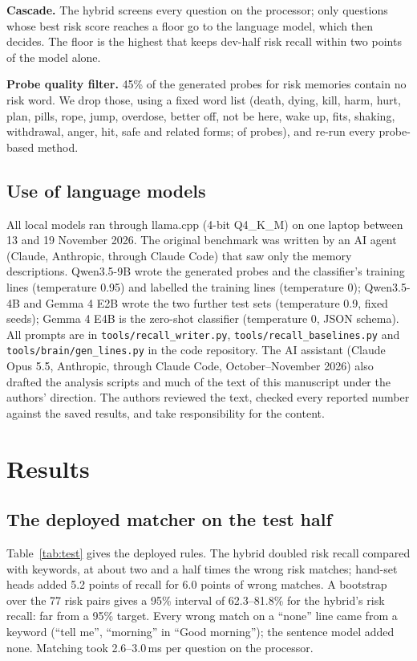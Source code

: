 \documentclass[sn-mathphys-num]{sn-jnl}
\begin{document}
\textbf{Cascade.} The hybrid screens every question on the processor; only questions whose best risk score reaches a floor go to the language
model, which then decides. The floor is the highest that keeps dev-half risk recall within two points of the model alone.

\textbf{Probe quality filter.} 45\% of the generated probes for risk memories contain no risk word. We drop those, using a fixed word list (death,
dying, kill, harm, hurt, plan, pills, rope, jump, overdose, better off, not be here, wake up, fits, shaking, withdrawal, anger, hit, safe and
related forms; \numFilterDropped{} of \numFilterTotal{} probes), and re-run every probe-based method.

\subsection{Use of language models}
All local models ran through llama.cpp (4-bit Q4\_K\_M) on one laptop between 13 and 19 November 2026. The original benchmark was written by
an AI agent (Claude, Anthropic, through Claude Code) that saw only the memory descriptions. Qwen3.5-9B wrote the generated probes and the
classifier's training lines (temperature 0.95) and labelled the training lines (temperature 0); Qwen3.5-4B and Gemma 4 E2B wrote the two
further test sets (temperature 0.9, fixed seeds); Gemma 4 E4B is the zero-shot classifier (temperature 0, JSON schema). All prompts are in
\texttt{tools/recall\_writer.py}, \texttt{tools/recall\_baselines.py} and \texttt{tools/brain/gen\_lines.py} in the code repository. The AI
assistant (Claude Opus 5.5, Anthropic, through Claude Code, October--November 2026) also drafted the analysis scripts and much of the text of
this manuscript under the authors' direction. The authors reviewed the text, checked every reported number against the saved results, and
take responsibility for the content.

\section{Results}\label{sec:results}

\subsection{The deployed matcher on the test half}
Table~\ref{tab:test} gives the deployed rules. The hybrid doubled risk recall compared with keywords, at about two and a half times the wrong
risk matches; hand-set heads added 5.2 points of recall for 6.0 points of wrong matches. A bootstrap over the 77 risk pairs gives a 95\% interval
of 62.3--81.8\% for the hybrid's risk recall: far from a 95\% target. Every wrong match on a ``none'' line came from a keyword (``tell me'',
``morning'' in ``Good morning''); the sentence model added none. Matching took 2.6--3.0\,ms per question on the processor.
\end{document}
